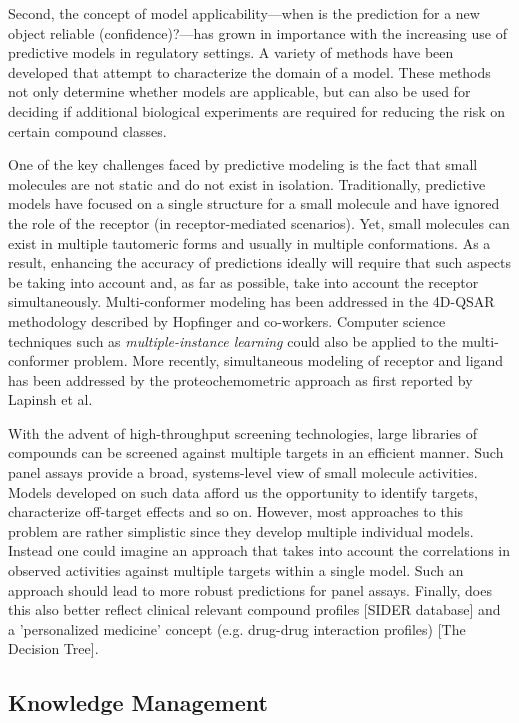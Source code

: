 \documentclass{sig-alternate}
\begin{document}
Second, the concept of model applicability---when is the prediction
for a new object reliable (confidence)?---has grown in importance with
the increasing use of predictive models in regulatory settings. A
variety of methods have been developed that attempt to characterize
the domain of a model. These methods not only determine whether models
are applicable, but can also be used for deciding if additional
biological experiments are required for reducing the risk on certain
compound classes.

One of the key challenges faced by predictive modeling is the fact
that small molecules are not static and do not exist in
isolation. Traditionally, predictive models have focused on a single
structure for a small molecule and have ignored the role of the
receptor (in receptor-mediated scenarios). Yet, small molecules can
exist in multiple tautomeric forms and usually in multiple
conformations. As a result, enhancing the accuracy of predictions
ideally will require that such aspects be taking into account and, as
far as possible, take into account the receptor
simultaneously. Multi-conformer modeling has been addressed in the
4D-QSAR methodology described by Hopfinger and co-workers.  Computer
science techniques such as \emph{multiple-instance learning} could
also be applied to the multi-conformer problem. More recently,
simultaneous modeling of receptor and ligand has been addressed by the
proteochemometric approach as first reported by Lapinsh et al.

With the advent of high-throughput screening technologies, large libraries of
compounds can be screened against multiple targets in an efficient manner. Such
panel assays provide a broad, systems-level view of small molecule activities.
Models developed on such data afford us the opportunity to identify targets,
characterize off-target effects and so on. However, most approaches to this
problem are rather simplistic since they develop multiple individual models.
Instead one could imagine an approach that takes into account the correlations
in observed activities against multiple targets within a single model. Such an
approach should lead to more robust predictions for panel assays. Finally, does
this also better reflect clinical relevant compound profiles [SIDER database]
and a 'personalized medicine' concept (e.g. drug-drug interaction profiles) [The
Decision Tree].

\subsection{Knowledge Management}
\label{sec:knowledge-management}
\end{document}
